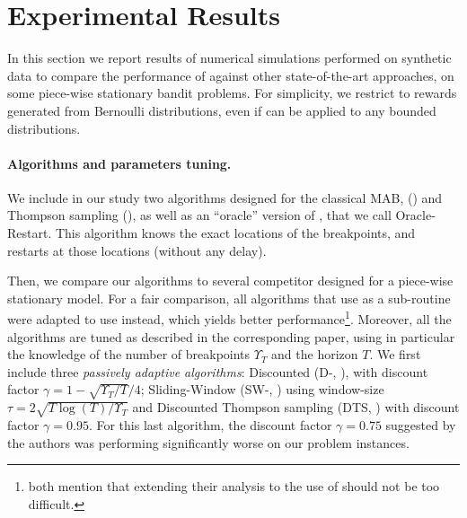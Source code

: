 \section{Experimental Results}
\label{sec:6:NumericalExperiments}

In this section we report results of numerical simulations performed on synthetic data to compare the performance of \GLRklUCB{} against other state-of-the-art approaches, on some piece-wise stationary bandit problems.
%
For simplicity, we restrict to rewards generated from Bernoulli distributions, even if \GLRklUCB{} can be applied to any bounded distributions.


\paragraph{Algorithms and parameters tuning.}
\label{sub:6:ParametersTuning}

We include in our study two algorithms designed for the classical MAB, \klUCB{} (\cite{Garivier11KL}) and Thompson sampling (\cite{AgrawalGoyal11,Kaufmann12Thompson}),
as well as an ``oracle'' version of \klUCB, that we call Oracle-Restart. This algorithm knows the exact locations of the breakpoints, and restarts \klUCB{} at those locations (without any delay).

Then, we compare our algorithms to several competitor designed for a piece-wise stationary model. For a fair comparison, all algorithms that use  \UCB{} as a sub-routine were adapted to use \klUCB{} instead, which yields better performance\footnote{\cite{LiuLeeShroff17,CaoZhenKvetonXie18} both mention that extending their analysis to the use of \klUCB{} should not be too difficult.}. Moreover, all the algorithms are tuned as described in the corresponding paper, using in particular the knowledge of the number of breakpoints $\Upsilon_T$ and the horizon $T$. We first include three \emph{passively adaptive algorithms}:
Discounted \klUCB{} (D-\klUCB, \cite{Kocsis06}), with discount factor $\gamma = 1 - \sqrt{\Upsilon_T/T}/4$; Sliding-Window \klUCB{} (SW-\klUCB,  \cite{Garivier11UCBDiscount}) using window-size $\tau = 2 \sqrt{T\log(T)/\Upsilon_T}$ and Discounted Thompson sampling (DTS, \cite{RajKalyani17}) with discount factor $\gamma = 0.95$. For this last algorithm, the discount factor $\gamma=0.75$ suggested by the authors was performing significantly worse on our problem instances.


